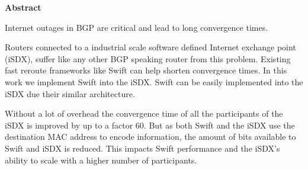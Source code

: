 \clearpage
\null
\vfil %
\thispagestyle{plain}
\begin{center}\textbf{Abstract}\end{center}
Internet outages in BGP are critical and lead to long convergence times. 

Routers connected to a industrial scale software defined Internet exchange point (iSDX), suffer like any other BGP speaking router from this problem. Existing fast reroute frameworks like Swift can help shorten convergence times. In this work we implement Swift into the iSDX. Swift can be easily implemented into the iSDX due their similar architecture. 

Without a lot of overhead the convergence time of all the participants of the iSDX is improved by up to a factor 60. But as both Swift and the iSDX use the destination MAC address to encode information, the amount of bits available to Swift and iSDX is reduced. This impacts Swift performance and the iSDX's ability to scale with a higher number of participants.
\vfil
\clearpage 
